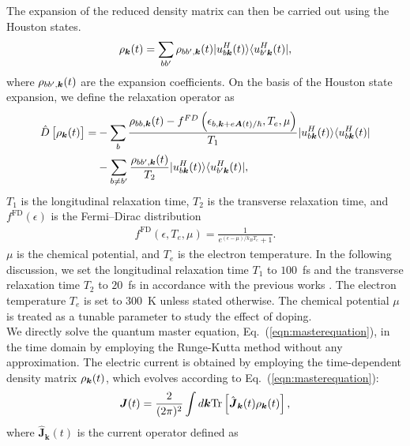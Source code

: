 The expansion of the reduced density matrix can then be carried out using the Houston states.
\begin{align}
  \rho_{\boldsymbol k}(t) = \sum_{bb'}\rho_{bb',\boldsymbol k}(t)|u^H_{b\boldsymbol k}(t)\rangle \langle u^H_{b'\boldsymbol k}(t)|,
\end{align}
where $\rho_{bb',\boldsymbol k}(t)$ are the expansion coefficients. On the basis of the Houston state expansion, we define the relaxation operator \cite{sato2019microscopic,PhysRevB.99.214302,sato2019light} as
\begin{align}
    \hat D\left [\rho_{\boldsymbol k}(t) \right ]=&-\sum_{b}\frac{\rho_{bb,\boldsymbol k}(t)-f^{FD}\left
(\epsilon_{b,\boldsymbol k+e\boldsymbol A(t)/\hbar},T_e,\mu \right)}{T_1}|u^H_{b\boldsymbol k}(t)\rangle \langle
u^H_{b\boldsymbol k}(t)|\\ 
                                            &-\sum_{b\neq b'} \frac{\rho_{bb',\boldsymbol k}(t)}{T_2}|u^H_{b\boldsymbol k}(t)\rangle \langle u^H_{b'\boldsymbol k}(t)|,
\label{eqn:relaxation}
\end{align}
$T_1$ is the longitudinal relaxation time, $T_2$ is the transverse relaxation time, and $f^{\mathrm{FD}}(\epsilon)$ is the Fermi--Dirac distribution
\begin{align}
f^{\mathrm{FD}}(\epsilon, T_e, \mu)=\frac{1}{e^{(\epsilon-\mu)/k_BT_e}+1}.
\label{eq:fd-dist}
\end{align}
$\mu$ is the chemical potential, and $T_e$ is the electron temperature.
In the following discussion, we set the longitudinal relaxation time $T_1$ to $100$~fs and the transverse relaxation time $T_2$ to $20$~fs in accordance with the previous works \cite{sato2021nonlinear,sato2021high,sato2019light,sato2019microscopic}. The electron temperature $T_e$ is set to $300$~K unless stated otherwise. The chemical potential $\mu$ is treated as a tunable parameter to study the effect of doping.\\
We directly solve the quantum master equation, Eq.~(\ref{eqn:masterequation}), in the time domain by employing the Runge-Kutta method without any approximation.
The electric current is obtained by employing the time-dependent density matrix $\rho_{\boldsymbol k}(t)$, which evolves according to Eq.~(\ref{eqn:masterequation}):
\begin{eqnarray}
  \boldsymbol{J}(t)=\frac{2}{(2\pi)^2} \int d\boldsymbol k \mathrm{Tr}\left[\hat{\boldsymbol{J}}_{\boldsymbol{k}}(t)\rho_{\boldsymbol{k}}(t)\right],
\label{eqn:totalcurrent}
\end{eqnarray}
where $\hat{\boldsymbol{J}}_{\boldsymbol{k}}(t)$ is the current operator defined as
